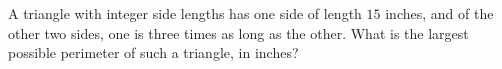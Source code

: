 A triangle with integer side lengths has one side of length $15$ inches, and of the other two sides, one is three times as long as the other. What is the largest possible perimeter of such a triangle, in inches?
